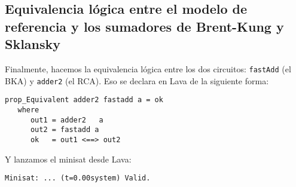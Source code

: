 \subsection{Equivalencia lógica entre el modelo de referencia y los sumadores de Brent-Kung y Sklansky}
Finalmente, hacemos la equivalencia lógica entre los dos circuitos: {\footnotesize\verb|fastAdd|} (el BKA) y {\footnotesize\verb|adder2|} (el RCA). Eso se declara en Lava de la siguiente forma:
{\footnotesize
\begin{verbatim}
prop_Equivalent adder2 fastadd a = ok
   where
      out1 = adder2   a
      out2 = fastadd a
      ok   = out1 <==> out2
\end{verbatim}
}
Y lanzamos el minisat desde Lava:
{\footnotesize
\begin{verbatim}
Minisat: ... (t=0.00system) Valid.
\end{verbatim}
}
